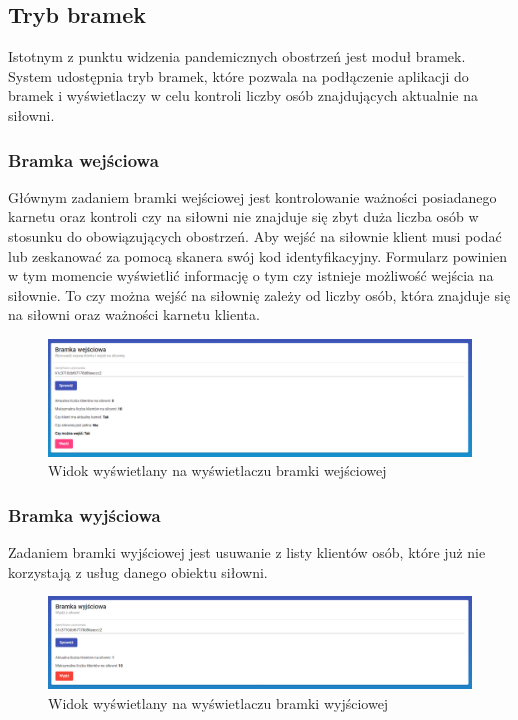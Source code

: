 \documentclass[a4paper,twoside,12pt]{book}
\begin{document}
\subsection{Tryb bramek}
Istotnym z punktu widzenia pandemicznych obostrzeń jest moduł bramek. System udostępnia tryb bramek, które pozwala na podłączenie aplikacji do bramek i wyświetlaczy w celu kontroli liczby osób znajdujących aktualnie na siłowni.
\subsubsection{Bramka wejściowa}
Głównym zadaniem bramki wejściowej jest kontrolowanie ważności posiadanego karnetu oraz kontroli czy na siłowni nie znajduje się zbyt duża liczba osób w stosunku do obowiązujących obostrzeń. Aby wejść na siłownie klient musi podać lub zeskanować za pomocą skanera swój kod identyfikacyjny. Formularz powinien w tym momencie wyświetlić informację o tym czy istnieje możliwość wejścia na siłownie. To czy można wejść na siłownię zależy od liczby osób, która znajduje się na siłowni oraz ważności karnetu klienta.
\begin{figure}[H]
	\centering
	\includegraphics[width=1\linewidth]{../zrzuty_ekranu/dzialanie/bramki/bramka_wejsciowa}
	\caption{Widok wyświetlany na wyświetlaczu bramki wejściowej}
	\label{fig:bramkawejsciowa}
\end{figure}

\subsubsection{Bramka wyjściowa}
Zadaniem bramki wyjściowej jest usuwanie z listy klientów osób, które już nie korzystają z usług danego obiektu siłowni.
\begin{figure}[H]
	\centering
	\includegraphics[width=1\linewidth]{../zrzuty_ekranu/dzialanie/bramki/bramka_wyjsciowa}
	\caption{Widok wyświetlany na wyświetlaczu bramki wyjściowej}
	\label{fig:bramkawyjsciowa}
\end{figure}
\end{document}
